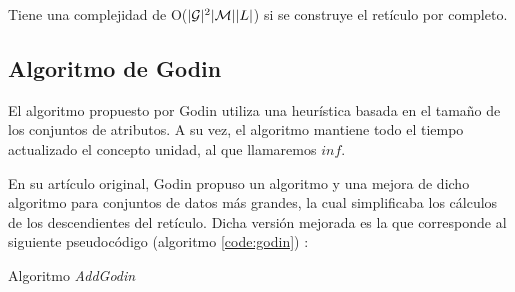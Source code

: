 \documentclass[oneside,openright,titlepage,numbers=noenddot,openany,headinclude,footinclude=true,
cleardoublepage=empty,abstractoff,BCOR=5mm,paper=a4,fontsize=12pt,main=spanish]{scrreprt}
\begin{document}
Tiene una complejidad de O($|\mathcal{G}|^2|\mathcal{M}||L|$) \cite{norris_algorithm_1978} si se construye el retículo por completo.


\subsection{Algoritmo de Godin}
\label{alg:godin}


El algoritmo propuesto por Godin \cite{godin_incremental_1995} utiliza una heurística basada en el tamaño de los conjuntos de atributos. A su vez, el algoritmo mantiene todo el tiempo actualizado el concepto unidad, al que llamaremos $inf$.

En su artículo original, Godin propuso un algoritmo y una mejora de dicho algoritmo para conjuntos de datos más grandes, la cual simplificaba los cálculos de los descendientes del retículo. Dicha versión mejorada es la que corresponde al siguiente pseudocódigo (algoritmo \ref{code:godin}) \cite{godin_incremental_1995}: \\

\begin{algorithm}[H]
\caption{Algoritmo \textit{AddGodin}}
\label{code:godin}
\end{algorithm}
\end{document}
